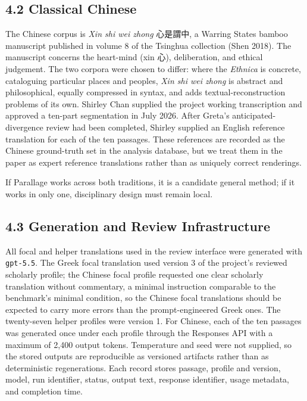 \documentclass[
  12pt,
]{article}
\begin{document}
\subsection{4.2 Classical Chinese}\label{classical-chinese}

The Chinese corpus is \emph{Xin shi wei zhong} 心是謂中, a Warring
States bamboo manuscript published in volume 8 of the Tsinghua
collection (Shen 2018). The manuscript concerns the heart-mind (xin
心), deliberation, and ethical judgement. The two corpora were chosen
to differ: where the \emph{Ethnica} is concrete, cataloguing particular
places and peoples, \emph{Xin shi wei zhong} is abstract and
philosophical, equally compressed in syntax, and adds
textual-reconstruction problems of its own. Shirley
Chan supplied the project working
transcription and approved a ten-part segmentation in July 2026. After
Greta's anticipated-divergence review had been completed, Shirley
supplied an English reference translation for each of the ten passages.
These references are recorded as the Chinese ground-truth set in the
analysis database, but we treat them in the paper as expert reference
translations rather than as uniquely correct renderings.

If Parallage works across both traditions, it is a candidate general
method; if it works in only one, disciplinary design must remain local.

\subsection{4.3 Generation and Review
Infrastructure}\label{generation-and-review-infrastructure}

All focal and helper translations used in the review interface were
generated with \texttt{gpt-5.5}. The Greek focal translation used
version 3 of the project's reviewed scholarly profile; the Chinese focal
profile requested one clear scholarly translation without commentary, a
minimal instruction comparable to the benchmark's minimal condition, so
the Chinese focal translations should be expected to carry more errors
than the prompt-engineered Greek ones.
The twenty-seven helper profiles were version 1. For Chinese, each of
the ten passages was generated once under each profile through the
Responses API with a maximum of 2,400 output tokens. Temperature and
seed were not supplied, so the stored outputs are reproducible as
versioned artifacts rather than as deterministic regenerations. Each
record stores passage, profile and version, model, run identifier,
status, output text, response identifier, usage metadata, and completion
time.
\end{document}
